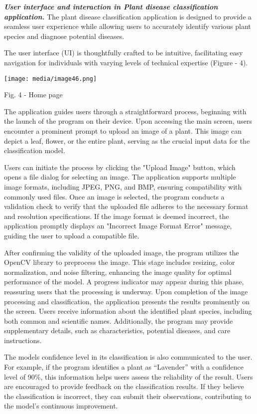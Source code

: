 \documentclass[
]{article}
\begin{document}
\emph{\textbf{User interface and interaction in Plant disease
classification application.}} The plant disease classification
application is designed to provide a seamless user experience while
allowing users to accurately identify various plant species and diagnose
potential diseases.

The user interface (UI) is thoughtfully crafted to be intuitive,
facilitating easy navigation for individuals with varying levels of
technical expertise (Figure - 4).

\texttt{[image: media/image46.png]}

Fig. 4 - Home page

The application guides users through a straightforward process,
beginning with the launch of the program on their device. Upon accessing
the main screen, users encounter a prominent prompt to upload an image
of a plant. This image can depict a leaf, flower, or the entire plant,
serving as the crucial input data for the classification model.

Users can initiate the process by clicking the "Upload Image" button,
which opens a file dialog for selecting an image. The application
supports multiple image formats, including JPEG, PNG, and BMP, ensuring
compatibility with commonly used files. Once an image is selected, the
program conducts a validation check to verify that the uploaded file
adheres to the necessary format and resolution specifications. If the
image format is deemed incorrect, the application promptly displays an
"Incorrect Image Format Error" message, guiding the user to upload a
compatible file.

After confirming the validity of the uploaded image, the program
utilizes the OpenCV library to preprocess the image. This stage includes
resizing, color normalization, and noise filtering, enhancing the image
quality for optimal performance of the model. A progress indicator may
appear during this phase, reassuring users that the processing is
underway. Upon completion of the image processing and classification,
the application presents the results prominently on the screen. Users
receive information about the identified plant species, including both
common and scientific names. Additionally, the program may provide
supplementary details, such as characteristics, potential diseases, and
care instructions.

The model\textquotesingle s confidence level in its classification is
also communicated to the user. For example, if the program identifies a
plant as ``Lavender'' with a confidence level of 90\%, this information
helps users assess the reliability of the result. Users are encouraged
to provide feedback on the classification results. If they believe the
classification is incorrect, they can submit their observations,
contributing to the model's continuous improvement.
\end{document}
